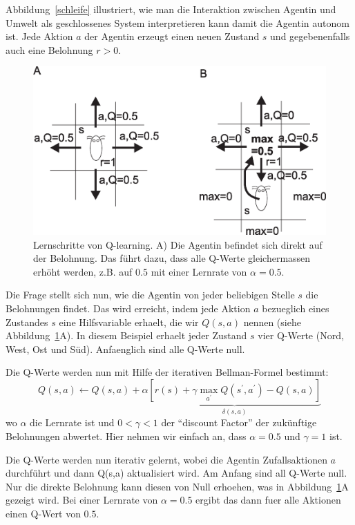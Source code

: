 \documentclass[12pt]{report}
\begin{document}
Abbildung~\ref{schleife} illustriert, wie man die Interaktion
zwischen Agentin und Umwelt als geschlossenes System interpretieren
kann damit die Agentin autonom ist. Jede Aktion $a$ der Agentin
erzeugt einen neuen Zustand $s$ und gegebenenfalls auch eine
Belohnung $r > 0$.

\begin{figure}[!hbt]
\begin{center}
\mbox{\includegraphics[width=\textwidth]{learning_steps}}
\end{center}
\caption{Lernschritte von Q-learning. A) Die Agentin befindet
  sich direkt auf der Belohnung. Das führt dazu, dass alle
  Q-Werte gleichermassen erhöht werden, z.B. auf $0.5$ mit
  einer Lernrate von $\alpha = 0.5$.
\label{learning_steps}}
\end{figure}

Die Frage stellt sich nun, wie die Agentin von jeder beliebigen Stelle
$s$ die Belohnungen findet. Das wird erreicht, indem jede Aktion $a$
bezueglich eines Zustandes $s$ eine Hilfsvariable erhaelt, die wir
$Q(s,a)$ nennen (siehe Abbildung~\ref{learning_steps}A). In diesem
Beispiel erhaelt jeder Zustand $s$ vier Q-Werte (Nord, West, Ost
und S\"ud). Anfaenglich sind alle Q-Werte null.

Die Q-Werte werden nun mit Hilfe der iterativen Bellman-Formel bestimmt:
\begin{equation}
Q(s,a) \leftarrow Q(s,a) + \alpha \underbrace{\left[ r(s) + \gamma \max_{a^\prime} Q(s^\prime,a^\prime) - Q(s,a) \right]}_{\delta(s,a)} \label{bellit}
\end{equation}
wo $\alpha$ die Lernrate ist und $0 < \gamma < 1$ der ``discount Factor'' der zukünftige Belohnungen abwertet. Hier nehmen
wir einfach an, dass $\alpha = 0.5$ und $\gamma = 1$ ist.

Die Q-Werte werden nun iterativ gelernt, wobei die Agentin Zufallsaktionen $a$ durchführt und dann Q(s,a) aktualisiert wird.
Am Anfang sind all Q-Werte null. Nur die direkte Belohnung kann diesen von Null erhoehen, was in
Abbildung~\ref{learning_steps}A gezeigt wird. Bei einer Lernrate von $\alpha = 0.5$ ergibt das dann fuer alle
Aktionen einen Q-Wert von $0.5$.
\end{document}
